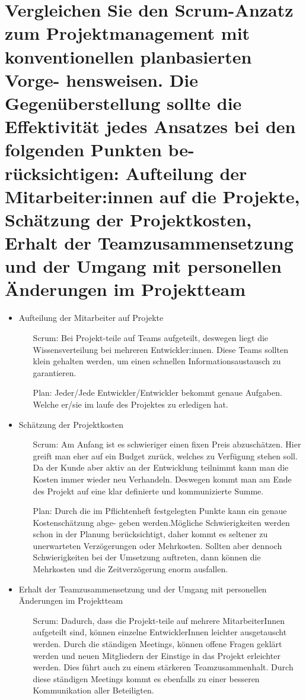 \documentclass[12pt]{article}
\begin{document}
\section{Vergleichen Sie den Scrum-Anzatz zum Projektmanagement mit konventionellen planbasierten Vorge-
hensweisen. Die Gegenüberstellung sollte die Effektivität jedes Ansatzes bei den folgenden Punkten be-
rücksichtigen: Aufteilung der Mitarbeiter:innen auf die Projekte, Schätzung der Projektkosten, Erhalt der
Teamzusammensetzung und der Umgang mit personellen Änderungen im Projektteam}
\begin{itemize}
 \item Aufteilung der Mitarbeiter auf Projekte
 \begin{itemize}
  \item [Scrum:] Bei Projekt-teile auf Teams aufgeteilt, deswegen liegt die Wissensverteilung bei mehreren Entwickler:innen. Diese Teams sollten klein gehalten werden, um einen schnellen Informationsaustausch zu garantieren.
  \item[Plan:] Jeder/Jede Entwickler/Entwickler bekommt genaue Aufgaben. Welche er/sie im laufe des Projektes zu erledigen hat.
 \end{itemize}
 \item Schätzung der Projektkosten
 \begin{itemize}
  \item [Scrum:] Am Anfang ist es schwieriger einen fixen Preis abzuschätzen. Hier greift man eher auf ein Budget zurück, welches zu Verfügung stehen soll. Da der Kunde aber aktiv an der Entwicklung teilnimmt kann man die Kosten immer wieder neu Verhandeln. Deswegen kommt man am Ende des Projekt auf eine klar definierte und kommunizierte Summe.
  \item [Plan:] Durch die im Pflichtenheft festgelegten Punkte kann ein genaue Kostenschätzung abge- geben werden.Mögliche Schwierigkeiten werden schon in der Planung berücksichtigt, daher kommt es seltener zu unerwarteten Verzögerungen oder Mehrkosten. Sollten aber dennoch Schwierigkeiten bei der Umsetzung auftreten, dann können die Mehrkosten und die Zeitverzögerung enorm ausfallen.
 \end{itemize}
 \item Erhalt der Teamzusammensetzung und der Umgang mit personellen Änderungen im Projektteam
 \begin{itemize}
  \item [Scrum:] Dadurch, dass die Projekt-teile auf mehrere MitarbeiterInnen aufgeteilt sind, können einzelne EntwicklerInnen leichter ausgetauscht werden. Durch die ständigen Meetings, können offene Fragen geklärt werden und neuen Mitgliedern der Einstige in das Projekt erleichter werden. Dies führt auch zu einem stärkeren Teamzusammenhalt. Durch diese ständigen Meetings kommt es ebenfalls zu einer besseren Kommunikation aller Beteiligten.


\end{itemize}
\end{itemize}
\end{document}
